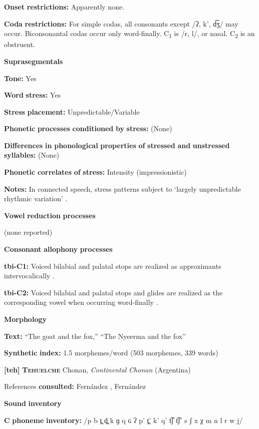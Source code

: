 \begin{styleBody}
\textbf{Onset} \textbf{restrictions:} Apparently none.

\textbf{Coda} \textbf{restrictions:} For simple codas, all consonants except /ʔ, k’, d͡ʒ/ may occur. Biconsonantal codas occur only word-finally. C\textsubscript{1} is /r, l/, or nasal. C\textsubscript{2} is an obstruent.

\textbf{Suprasegmentals}

\textbf{Tone:} Yes

\textbf{Word} \textbf{stress:} Yes

\textbf{Stress} \textbf{placement:} Unpredictable/Variable

\textbf{Phonetic} \textbf{processes} \textbf{conditioned} \textbf{by} \textbf{stress:} (None)

\textbf{Differences} \textbf{in} \textbf{phonological} \textbf{properties} \textbf{of} \textbf{stressed} \textbf{and} \textbf{unstressed} \textbf{syllables:} (None)

\textbf{Phonetic} \textbf{correlates} \textbf{of} \textbf{stress:} Intensity (impressionistic)

\textbf{Notes:} In connected speech, stress patterns subject to ‘largely unpredictable rhythmic variation’ \citep[12-13]{Crewe1975}.

\textbf{Vowel} \textbf{reduction} \textbf{processes}

(none reported)

\textbf{Consonant} \textbf{allophony} \textbf{processes}

\textbf{tbi-C1:} Voiced bilabial and palatal stops are realized as approximants intervocalically \citep[25]{Stirtz2011}.

\textbf{tbi-C2:} Voiced bilabial and palatal stops and glides are realized as the corresponding vowel when occurring word-finally \citep{Stirtz2011}.

\textbf{Morphology}

\textbf{Text:} “The goat and the fox,” “The Nyeerma and the fox” \citep[319-326]{Stirtz2011}

\textbf{Synthetic} \textbf{index:} 1.5 morphemes/word (503 morphemes, 339 words)

\textbf{[teh]}   \textbf{\textsc{Tehuelche}}  Chonan, \textit{Continental} \textit{Chonan} (Argentina)

References \textbf{consulted:} Fernández \citet{Garay1998}, Fernández \citet{GarayHernández2006}

\textbf{Sound} \textbf{inventory}

\textbf{C} \textbf{phoneme} \textbf{inventory:} /p b t̪ d̪ k ɡ q ɢ ʔ p’ t̪’ k’ q’ t͡ʃ t͡ʃ’ s ʃ x χ m n l r w j/


\end{styleBody}
